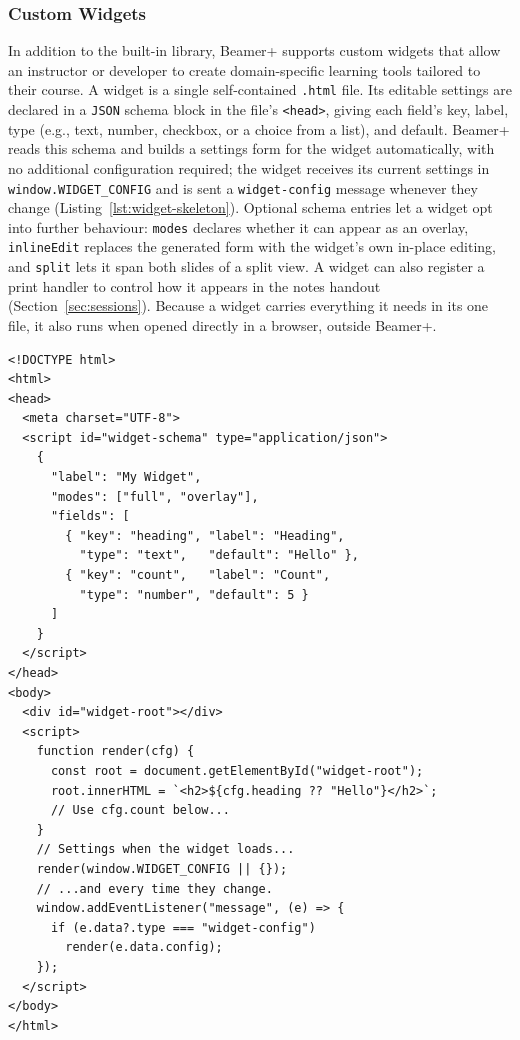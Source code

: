 \documentclass[sigconf]{acmart}
\begin{document}
\subsubsection{Custom Widgets}
In addition to the built-in library, Beamer+ supports custom widgets that allow an instructor or developer to create domain-specific learning tools tailored to their course. A widget is a single self-contained \texttt{.html} file. Its editable settings are declared in a \texttt{JSON} schema block in the file's \texttt{<head>}, giving each field's key, label, type (e.g., text, number, checkbox, or a choice from a list), and default. Beamer+ reads this schema and builds a settings form for the widget automatically, with no additional configuration required; the widget receives its current settings in \texttt{window.WIDGET\_CONFIG} and is sent a \texttt{widget-config} message whenever they change (Listing~\ref{lst:widget-skeleton}). Optional schema entries let a widget opt into further behaviour: \texttt{modes} declares whether it can appear as an overlay, \texttt{inlineEdit} replaces the generated form with the widget's own in-place editing, and \texttt{split} lets it span both slides of a split view. A widget can also register a print handler to control how it appears in the notes handout (Section~\ref{sec:sessions}). Because a widget carries everything it needs in its one file, it also runs when opened directly in a browser, outside Beamer+.
\begin{listing}[H]
\begin{verbatim}
<!DOCTYPE html>
<html>
<head>
  <meta charset="UTF-8">
  <script id="widget-schema" type="application/json">
    {
      "label": "My Widget",
      "modes": ["full", "overlay"],
      "fields": [
        { "key": "heading", "label": "Heading",
          "type": "text",   "default": "Hello" },
        { "key": "count",   "label": "Count",
          "type": "number", "default": 5 }
      ]
    }
  </script>
</head>
<body>
  <div id="widget-root"></div>
  <script>
    function render(cfg) {
      const root = document.getElementById("widget-root");
      root.innerHTML = `<h2>${cfg.heading ?? "Hello"}</h2>`;
      // Use cfg.count below...
    }
    // Settings when the widget loads...
    render(window.WIDGET_CONFIG || {});
    // ...and every time they change.
    window.addEventListener("message", (e) => {
      if (e.data?.type === "widget-config")
        render(e.data.config);
    });
  </script>
</body>
</html>
\end{verbatim}
\caption{Minimal custom widget skeleton. The \texttt{widget-schema} block declares editable settings; \texttt{render} draws the widget from their current values, on load and after every change.}
\label{lst:widget-skeleton}
\end{listing}
\end{document}
